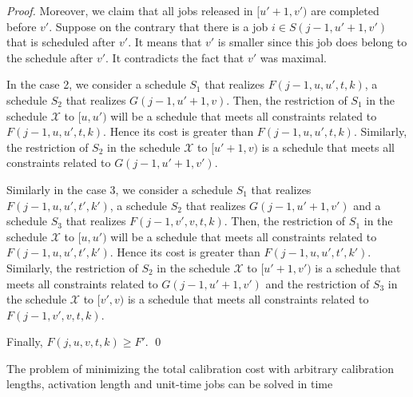 \begin{proof}
Moreover, we claim that all jobs released in $[u'+1,v')$ are completed before $v'$. Suppose on the contrary that there is a job $i\in S(j-1,u'+1,v')$ that is scheduled after $v'$. It means that $v'$ is smaller since this job does belong to the schedule after $v'$. It contradicts the fact that $v'$ was maximal. 


In the case 2, we consider a schedule $S_1$ that realizes $F(j-1,u,u',t,k)$, a schedule $S_2$ that realizes $G(j-1,u'+1,v)$. Then, the restriction of $S_1$ in the schedule $\mathcal{X}$ to $[u, u')$ will be a schedule that meets all constraints related to $F(j-1,u,u',t,k)$. Hence its cost is greater than $F(j-1,u,u',t,k)$. Similarly, the restriction of $S_2$ in the schedule $\mathcal{X}$ to $[u'+1, v)$ is a schedule that meets all constraints related to $G(j-1,u'+1,v')$.

Similarly in the case 3, we consider a schedule $S_1$ that realizes $F(j-1,u,u',t',k')$, a schedule $S_2$ that realizes $G(j-1,u'+1,v')$ and a schedule $S_3$ that realizes $F(j-1,v',v,t,k)$. Then, the restriction of $S_1$ in the schedule $\mathcal{X}$ to $[u, u')$ will be a schedule that meets all constraints related to $F(j-1,u,u',t',k')$. Hence its cost is greater than $F(j-1,u,u',t',k')$. Similarly, the restriction of $S_2$ in the schedule $\mathcal{X}$ to $[u'+1, v')$ is a schedule that meets all constraints related to $G(j-1,u'+1,v')$ and the restriction of $S_3$ in the schedule $\mathcal{X}$ to $[v', v)$ is a schedule that meets all constraints related to $F(j-1,v',v,t,k)$.

Finally, $F(j,u,v,t,k)\geq F'$.
\qed\end{proof}





\begin{prop}
The problem of minimizing the total calibration cost with arbitrary calibration
lengths, activation length and unit-time jobs can be solved in time
\end{prop}

